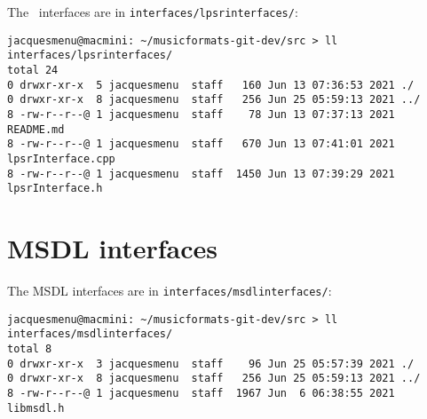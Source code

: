 The \lpsrRepr\ interfaces are in {\tt interfaces/lpsrinterfaces/}:
\begin{lstlisting}[language=Terminal]
jacquesmenu@macmini: ~/musicformats-git-dev/src > ll interfaces/lpsrinterfaces/
total 24
0 drwxr-xr-x  5 jacquesmenu  staff   160 Jun 13 07:36:53 2021 ./
0 drwxr-xr-x  8 jacquesmenu  staff   256 Jun 25 05:59:13 2021 ../
8 -rw-r--r--@ 1 jacquesmenu  staff    78 Jun 13 07:37:13 2021 README.md
8 -rw-r--r--@ 1 jacquesmenu  staff   670 Jun 13 07:41:01 2021 lpsrInterface.cpp
8 -rw-r--r--@ 1 jacquesmenu  staff  1450 Jun 13 07:39:29 2021 lpsrInterface.h
\end{lstlisting}


\section{MSDL interfaces}

The MSDL interfaces are in {\tt interfaces/msdlinterfaces/}:
\begin{lstlisting}[language=Terminal]
jacquesmenu@macmini: ~/musicformats-git-dev/src > ll interfaces/msdlinterfaces/
total 8
0 drwxr-xr-x  3 jacquesmenu  staff    96 Jun 25 05:57:39 2021 ./
0 drwxr-xr-x  8 jacquesmenu  staff   256 Jun 25 05:59:13 2021 ../
8 -rw-r--r--@ 1 jacquesmenu  staff  1967 Jun  6 06:38:55 2021 libmsdl.h
\end{lstlisting}


